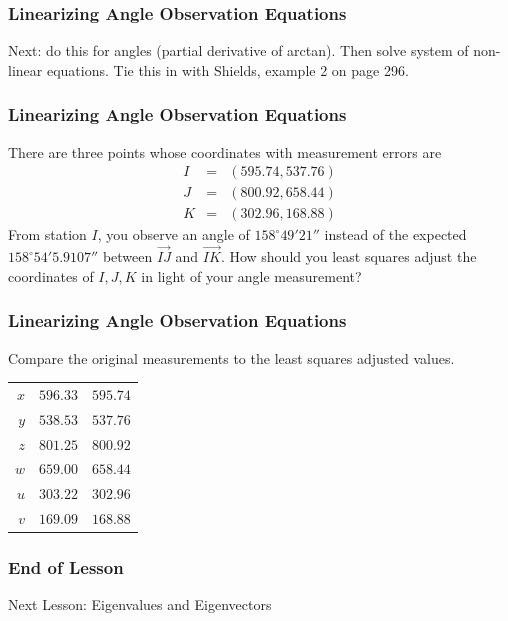 \documentclass[xcolor=dvipsnames]{beamer}
\begin{document}
\begin{frame}
  \frametitle{Linearizing Angle Observation Equations}
  Next: do this for angles (partial derivative of arctan). Then solve
  system of non-linear equations. Tie this in with Shields, example 2
  on page 296.
\end{frame}

\begin{frame}
  \frametitle{Linearizing Angle Observation Equations}
   There are three points whose
  coordinates with measurement errors are
  \begin{equation}
    \label{eq:aukoogha}
    \begin{array}{rcl}
      I&=&(595.74,537.76) \\
       J&=&(800.92,658.44) \\
       K&=&(302.96,168.88)
    \end{array}
  \end{equation}
From station $I$, you observe an angle of $158^{\circ}49'21''$ instead
of the expected $158^{\circ}54'5.9107''$ between $\vec{IJ}$ and
$\vec{IK}$. How should you least squares adjust the coordinates of
$I,J,K$ in light of your angle measurement?
\end{frame}

\begin{frame}
  \frametitle{Linearizing Angle Observation Equations}
Compare the original measurements to the least squares adjusted
values.

\bigskip

\begin{tabular}{|r|l|l|}
      $x$ & $596.33$ & $595.74$ \\ 
      $y$ & $538.53$ & $537.76$ \\ 
      $z$ & $801.25$ & $800.92$ \\ 
      $w$ & $659.00$ & $658.44$ \\ 
      $u$ & $303.22$ & $302.96$ \\ 
      $v$ & $169.09$ & $168.88$ 
\end{tabular}
\end{frame}

\begin{frame}
  \frametitle{End of Lesson}
Next Lesson: Eigenvalues and Eigenvectors
\end{frame}
\end{document}
